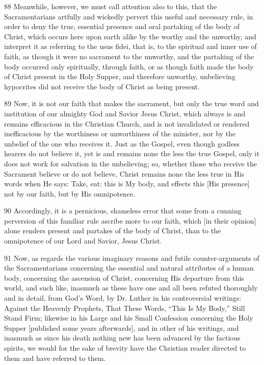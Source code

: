88 Meanwhile, however, we must call attention also to this, that the Sacramentarians artfully and wickedly pervert this useful and necessary rule, in order to deny the true, essential presence and oral partaking of the body of Christ, which occurs here upon earth alike by the worthy and the unworthy, and interpret it as referring to the usus fidei, that is, to the spiritual and inner use of faith, as though it were no sacrament to the unworthy, and the partaking of the body occurred only spiritually, through faith, or as though faith made the body of Christ present in the Holy Supper, and therefore unworthy, unbelieving hypocrites did not receive the body of Christ as being present.

89 Now, it is not our faith that makes the sacrament, but only the true word and institution of our almighty God and Savior Jesus Christ, which always is and remains efficacious in the Christian Church, and is not invalidated or rendered inefficacious by the worthiness or unworthiness of the minister, nor by the unbelief of the one who receives it. Just as the Gospel, even though godless hearers do not believe it, yet is and remains none the less the true Gospel, only it does not work for salvation in the unbelieving; so, whether those who receive the Sacrament believe or do not believe, Christ remains none the less true in His words when He says: Take, eat: this is My body, and effects this [His presence] not by our faith, but by His omnipotence.

90 Accordingly, it is a pernicious, shameless error that some from a cunning perversion of this familiar rule ascribe more to our faith, which [in their opinion] alone renders present and partakes of the body of Christ, than to the omnipotence of our Lord and Savior, Jesus Christ.

91 Now, as regards the various imaginary reasons and futile counter-arguments of the Sacramentarians concerning the essential and natural attributes of a human body, concerning the ascension of Christ, concerning His departure from this world, and such like, inasmuch as these have one and all been refuted thoroughly and in detail, from God’s Word, by Dr. Luther in his controversial writings: Against the Heavenly Prophets, That These Words, “This Is My Body,” Still Stand Firm; likewise in his Large and his Small Confession concerning the Holy Supper [published some years afterwards], and in other of his writings, and inasmuch as since his death nothing new has been advanced by the factious spirits, we would for the sake of brevity have the Christian reader directed to them and have referred to them.

